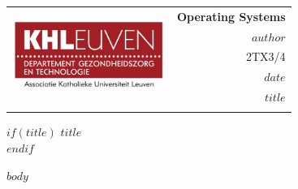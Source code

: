 \documentclass[a4paper]{article}
\begin{document}
\noindent \begin{tabular}{lr}
\multirow{5}{10cm}[5mm]{\includegraphics[width=50mm]{LogoGT.jpg} \hfill}
& {\bf Operating Systems} \\
& {\bf $author$}\\
& 2TX3/4\\
& $date$ \\
& {\bf $title$} 
\\ & \\ \hline
\end{tabular}


\vspace{0.4cm}
\noindent
$if(title)$
{\huge {\bf $title$
\\}}
$endif$

\noindent
$body$
\end{document}
